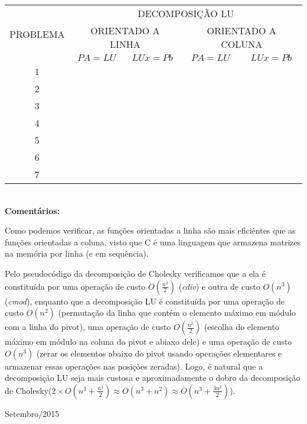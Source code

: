 \documentclass[a4paper,11pt]{article}
\begin{document}
\begin{table}[htb]
	\label{tab:inters}
	\large
	\centering
	\begin{tabular}{|c|c|c||c|c|}
		\hline
		\multirow{3}{*}{PROBLEMA} & \multicolumn{4}{|c|}{DECOMPOSIÇÃO LU} \\
		\cline{2-5}
		& \multicolumn{2}{|c||}{ORIENTADO A LINHA} & \multicolumn{2}{|c|}{ORIENTADO A COLUNA} \\
		\cline{2-5}
		& $PA=LU$ & $LUx=Pb$ & $PA=LU$ & $LUx=Pb$ \\
		\hline
		\hline
		1 &  &  &  &\\
		2 &  &  &  &\\
		3 &  &  &  &\\
		4 &  &  &  &\\
		5 &  &  &  &\\
		6 &  &  &  &\\
		7 &  &  &  &\\
		\hline
	\end{tabular}
\end{table}
\  \\
{\bf Comentários:}

Como podemos verificar, as funções orientadas a linha são mais eficiêntes que as funções orientadas a coluna, visto que C é uma linguagem que armazena matrizes na memória por linha (e em sequência). 

Pelo pseudocódigo da decomposição de Cholesky verificamos que a ela é constituída por uma operação de custo $O(\frac{n^{2}}{2})$ ({\it cdiv}) e outra de custo $O(n^{3})$ ({\it cmod}), enquanto que a decomposição LU é constituída por uma operação de custo $O(n^{2})$ (permutação da linha que contém o elemento máximo em módulo com a linha do pivot), uma operação de custo $O(\frac{n^{2}}{2})$ (escolha do elemento máximo em módulo na coluna do pivot e abiaxo dele) e uma operação de custo $O(n^{3})$ (zerar os elementos abaixo do pivot usando operações elementares e armazenar essas operações nas posições zeradas). Logo, é natural que a decomposição LU seja mais custosa e aproximadamente o dobro da decomposição de Cholesky($2 \times O(n^{3}+\frac{n^{2}}{2}) \approx O(n^{3}+n^{2}) \approx O(n^{3}+\frac{3n^{2}}{2}) $). 

\vfill

\raggedleft
{\sc Setembro/2015}
\end{document}
